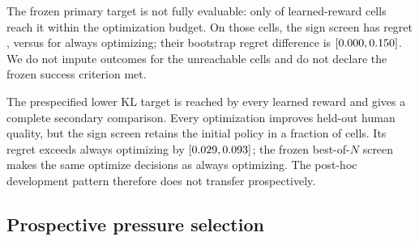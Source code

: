 \documentclass[11pt]{article}
\begin{document}
\begin{table}[t]
\centering
\small
{}
\caption{Prospective learned-reward confirmation.  ``Better'' and ``Worse''
count optimization outcomes relative to the initial policy.  Regret is mean
human-quality loss relative to the better decision.}
\label{tab:confirmation}
\end{table}

The frozen primary target is not fully evaluable: only
\ConfirmPrimaryReachable{} of \ConfirmCells{} learned-reward cells reach it
within the optimization budget.  On those cells, the sign screen has regret
\ConfirmPrimarySignRegret{}, versus \ConfirmPrimaryOptimizeRegret{} for always
optimizing; their bootstrap regret difference is \ConfirmPrimaryRegretGap{}
$[0.000{},0.150{}]$.  We do not
impute outcomes for the \ConfirmPrimaryUnreachable{} unreachable cells and do
not declare the frozen success criterion met.

The prespecified lower KL target is reached by every learned reward and gives a
complete secondary comparison.  Every optimization improves held-out human
quality, but the sign screen retains the initial policy in a fraction
\ConfirmSecondarySignFalseKeep{} of cells.  Its regret exceeds always optimizing
by \ConfirmSecondaryRegretGap{}
$[0.029{},0.093{}]$; the frozen
best-of-$N$ screen makes the same optimize decisions as always optimizing.  The
post-hoc development pattern therefore does not transfer prospectively.

\subsection{Prospective pressure selection}
\end{document}
